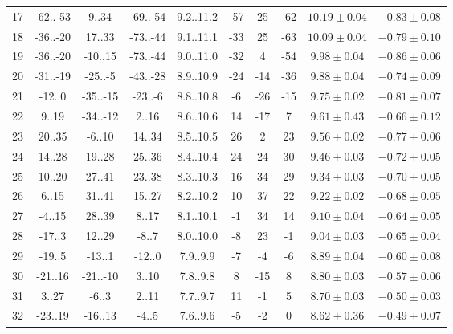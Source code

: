 \begin{tabular}{cccccccccc}
17 & -62..-53 & 9..34 & -69..-54 & 9.2..11.2 & -57 & 25 & -62 & $10.19\pm0.04$ & $-0.83\pm0.08$ \\
18 & -36..-20 & 17..33 & -73..-44 & 9.1..11.1 & -33 & 25 & -63 & $10.09\pm0.04$ & $-0.79\pm0.10$ \\
19 & -36..-20 & -10..15 & -73..-44 & 9.0..11.0 & -32 & 4 & -54 & $9.98\pm0.04$ & $-0.86\pm0.06$ \\
20 & -31..-19 & -25..-5 & -43..-28 & 8.9..10.9 & -24 & -14 & -36 & $9.88\pm0.04$ & $-0.74\pm0.09$ \\
21 & -12..0 & -35..-15 & -23..-6 & 8.8..10.8 & -6 & -26 & -15 & $9.75\pm0.02$ & $-0.81\pm0.07$ \\
22 & 9..19 & -34..-12 & 2..16 & 8.6..10.6 & 14 & -17 & 7 & $9.61\pm0.43$ & $-0.66\pm0.12$ \\
23 & 20..35 & -6..10 & 14..34 & 8.5..10.5 & 26 & 2 & 23 & $9.56\pm0.02$ & $-0.77\pm0.06$ \\
24 & 14..28 & 19..28 & 25..36 & 8.4..10.4 & 24 & 24 & 30 & $9.46\pm0.03$ & $-0.72\pm0.05$ \\
25 & 10..20 & 27..41 & 23..38 & 8.3..10.3 & 16 & 34 & 29 & $9.34\pm0.03$ & $-0.70\pm0.05$ \\
26 & 6..15 & 31..41 & 15..27 & 8.2..10.2 & 10 & 37 & 22 & $9.22\pm0.02$ & $-0.68\pm0.05$ \\
27 & -4..15 & 28..39 & 8..17 & 8.1..10.1 & -1 & 34 & 14 & $9.10\pm0.04$ & $-0.64\pm0.05$ \\
28 & -17..3 & 12..29 & -8..7 & 8.0..10.0 & -8 & 23 & -1 & $9.04\pm0.03$ & $-0.65\pm0.04$ \\
29 & -19..5 & -13..1 & -12..0 & 7.9..9.9 & -7 & -4 & -6 & $8.89\pm0.04$ & $-0.60\pm0.08$ \\
30 & -21..16 & -21..-10 & 3..10 & 7.8..9.8 & 8 & -15 & 8 & $8.80\pm0.03$ & $-0.57\pm0.06$ \\
31 & 3..27 & -6..3 & 2..11 & 7.7..9.7 & 11 & -1 & 5 & $8.70\pm0.03$ & $-0.50\pm0.03$ \\
32 & -23..19 & -16..13 & -4..5 & 7.6..9.6 & -5 & -2 & 0 & $8.62\pm0.36$ & $-0.49\pm0.07$ \\
\hline \hline
\end{tabular}
